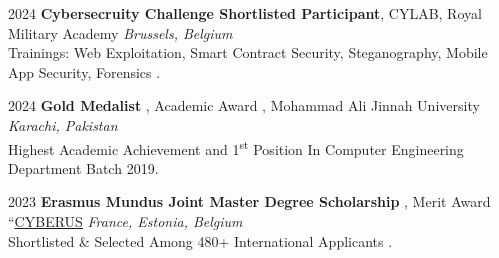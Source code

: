 
\begin{rSection}{}
  {\hspace{-0.5em}2024\hspace{1em}}{\bodyfont\bfseries\color{darktext} {Cybersecruity Challenge Shortlisted Participant}}{, CYLAB, Royal Military Academy
  } \hfill{\bodyfont\slshape\color{awesome} {Brussels, Belgium}}
  \\Trainings: Web Exploitation, Smart Contract Security, Steganography, Mobile App Security, Forensics .
  \end{rSection}

\begin{rSection}{}
  {\hspace{-0.5em}2024\hspace{1em}}{\bodyfont\bfseries\color{darktext} {Gold Medalist}}{ , Academic Award , Mohammad Ali Jinnah University
  } \hfill{\bodyfont\slshape\color{awesome} {Karachi, Pakistan}}
  \\Highest Academic Achievement and 1\textsuperscript{st} Position In Computer Engineering Department Batch 2019.
  \end{rSection}

  
\begin{rSection}{}
{\hspace{-0.5em}2023\hspace{1em}}{\bodyfont\bfseries\color{darktext} {Erasmus Mundus Joint Master Degree Scholarship}}{ , Merit Award ``\href{https://master-cyberus.eu/programme/overview}{CYBERUS}
} \hfill{\bodyfont\slshape\color{awesome} {France, Estonia, Belgium}}
\\Shortlisted \& Selected Among 480+ International Applicants .
\end{rSection}

